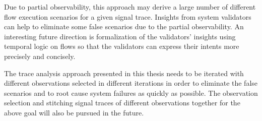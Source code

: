 \documentclass[12pt,frontmatter,copyright,thesis]{usfmanus}
\begin{document}
Due to partial observability, this approach may derive a
large number of different flow execution scenarios for a
given signal trace.  Insights from system validators can
help to eliminate some false scenarios due to the partial
observability.  An interesting future direction is
formalization of the validators' insights using temporal
logic on flows so that the validators can express their
intents more precisely and concisely.

The trace analysis approach presented in this thesis needs to
be iterated with different observations selected in
different iterations in order to eliminate the false
scenarios and to root cause system failures as quickly as
possible.  The observation selection and stitching signal
traces of different observations together for the above goal
will also be pursued in the future.
\end{document}
